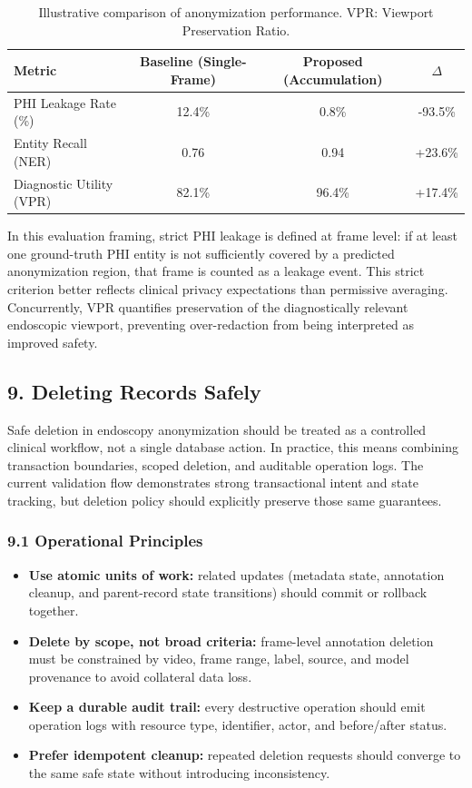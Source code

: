 \begin{table}[h]
\centering
\begin{tabular}{|l|c|c|c|}
\hline
\textbf{Metric} & \textbf{Baseline (Single-Frame)} & \textbf{Proposed (Accumulation)} & \textbf{$\Delta$} \\ \hline
PHI Leakage Rate (\%) & 12.4\% & 0.8\% & -93.5\% \\ \hline
Entity Recall (NER) & 0.76 & 0.94 & +23.6\% \\ \hline
Diagnostic Utility (VPR) & 82.1\% & 96.4\% & +17.4\% \\ \hline
\end{tabular}
\caption{Illustrative comparison of anonymization performance. VPR: Viewport Preservation Ratio.}
\end{table}

In this evaluation framing, strict PHI leakage is defined at frame level:
if at least one ground-truth PHI entity is not sufficiently covered by a
predicted anonymization region, that frame is counted as a leakage event. This
strict criterion better reflects clinical privacy expectations than permissive
averaging. Concurrently, VPR quantifies preservation of the diagnostically
relevant endoscopic viewport, preventing over-redaction from being interpreted
as improved safety.

\subsection*{9. Deleting Records Safely}
Safe deletion in endoscopy anonymization should be treated as a controlled
clinical workflow, not a single database action. In practice, this means
combining transaction boundaries, scoped deletion, and auditable operation logs.
The current validation flow demonstrates strong transactional intent and state
tracking, but deletion policy should explicitly preserve those same guarantees.

\subsubsection*{9.1 Operational Principles}
\begin{itemize}
  \item \textbf{Use atomic units of work:} related updates (metadata state,
  annotation cleanup, and parent-record state transitions) should commit or
  rollback together.
  \item \textbf{Delete by scope, not broad criteria:} frame-level annotation
  deletion must be constrained by video, frame range, label, source, and model
  provenance to avoid collateral data loss.
  \item \textbf{Keep a durable audit trail:} every destructive operation should
  emit operation logs with resource type, identifier, actor, and before/after
  status.
  \item \textbf{Prefer idempotent cleanup:} repeated deletion requests should
  converge to the same safe state without introducing inconsistency.
\end{itemize}

